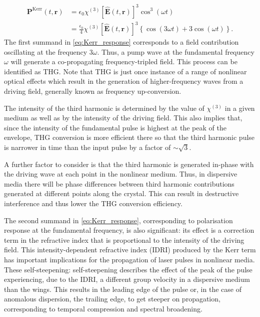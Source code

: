 \documentclass[a4paper]{jpconf}
\begin{document}
\begin{align}\label{eq:Kerr_response}
\nonumber  \mathbf{P}^\text{Kerr}(t,\mathbf{r}) &= \epsilon_0 \chi^{(3)} [\hat{\mathbf{E}}(t, \mathbf{r})]^3 \cos^3(\omega t) \\ &= \frac{\epsilon_0}{4}  \chi^{(3)} [\hat{\mathbf{E}}(t, \mathbf{r})]^3 \left\{ \cos (3\omega t) +  3 \cos(\omega t)\right\}.
\end{align}
The first summand in \eqref{eq:Kerr_response} corresponds to a field contribution oscillating at the frequency $3 \omega$. Thus, a pump wave at the fundamental frequency $\omega$ will generate a co-propagating frequency-tripled field. This process can be identified as THG. Note that THG is just once instance of a range of nonlinear optical effects which result in the generation of higher-frequency waves from a driving field, generally known as frequency up-conversion. \par 
The intensity of the third harmonic is determined by the value of $\chi^{(3)}$ in a given medium as well as by the intensity of the driving field. This also implies that, since the intensity of the fundamental pulse is highest at the peak of the envelope, THG conversion is more efficient there so that the third harmonic pulse is narrower in time than the input pulse by a factor of $\sim\sqrt{3}$. \par 
 A further factor to consider is that the third harmonic is generated in-phase with the driving wave at each point in the nonlinear medium. Thus, in dispersive media there will be phase differences between third harmonic contributions generated at different points along the crystal. This can result in destructive interference and thus lower the THG conversion efficiency. \par 
The second summand in \eqref{eq:Kerr_response}, corresponding to polarisation response at the fundamental frequency, is also significant: its effect is a correction term in the refractive index that is proportional to the intensity of the driving field. This intensity-dependent refractive index (IDRI) produced by the Kerr term has important implications for the propagation of laser pulses in nonlinear media. These self-steepening: self-steepening describes the effect of the peak of the pulse experiencing, due to the IDRI, a different group velocity in a dispersive medium than the wings. This results in the leading edge of the pulse or, in the case of anomalous dispersion, the trailing edge, to get steeper on propagation, corresponding to temporal compression and spectral broadening. \par 
\end{document}
